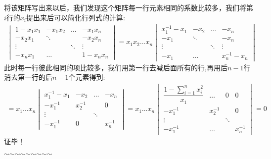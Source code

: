 \documentclass[a4paper,12pt]{ctexart}
\newenvironment{prooff}{{\noindent\it\textcolor{cyan!40!black}{Proof}:}\quad}{\par}
\begin{document}
\begin{prooff}
    将该矩阵写出来以后，我们发现这个矩阵每一行元素相同的系数比较多，我们将第$i$行的$x_i$提出来后可以简化行列式的计算:
    \begin{align*}
        \begin{vmatrix}
            1-x_1x_1 & -x_1x_2 & \dots  & -x_1x_n  \\
            -x_2x_1  & \ddots  &        & -x_2x_n  \\
            \vdots   &         & \ddots & \vdots   \\
            -x_nx_1  & \dots   &        & 1-x_nx_n
        \end{vmatrix}=x_1x_2\dots x_n\begin{vmatrix}
            x_1^{-1}-x_1 & -x_2   & \dots  & -x_n         \\
            -x_1         & \ddots &        & -x_n         \\
            \vdots       &        & \ddots & \vdots       \\
            -x_1         & \dots  &        & x_n^{-1}-x_n
        \end{vmatrix}
    \end{align*}
    此时每一行彼此相同的项比较多，我们用第一行去减后面所有的行,再用后$n-1$行消去第一行的后$n-1$个元素得到:
    \begin{align*}
        =x_1\dots x_n\begin{vmatrix}
            x_1^{-1}-x_1 & -x_2     & \dots  & -x_n     \\
            -x_1^{-1}    & x_2^{-1} &        & 0        \\
            \vdots       &          & \ddots &          \\
            -x_1^{-1}    & 0        &        & x_n^{-1}
        \end{vmatrix}=x_1\dots x_n\begin{vmatrix}
            \dfrac{1-\sum_{i=1}^{n}x_i^2}{x_1} & \dots    & 0      & 0        \\
            -x_1^{-1}                          & x_2^{-1} &        & 0        \\
            \vdots                             &          & \ddots &          \\
            -x_1^{-1}                          & \dots    &        & x_n^{-1}
        \end{vmatrix}=0
    \end{align*}
    证毕！
\end{prooff}
\noindent\hfil$\sim$\hfil$\sim$\hfil$\sim$\hfil$\sim$\hfil$\sim$\hfil$\sim$\hfil$\sim$\hfil$\sim$\hfil$\sim$\hfil
\end{document}
